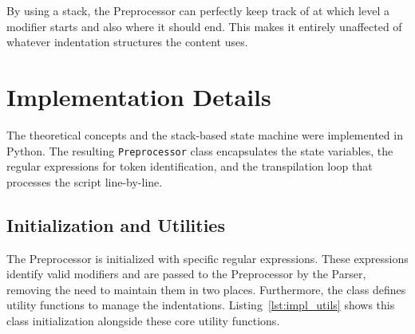 By using a stack, the Preprocessor can perfectly keep track of at which level a modifier starts and  also where it should end. This makes it entirely unaffected of whatever indentation structures the content uses.

\section{Implementation Details}


The theoretical concepts and the stack-based state machine were implemented in Python. The resulting \texttt{Preprocessor} class encapsulates the state variables, the regular expressions for token identification, and the transpilation loop that processes the script line-by-line. 


\subsection{Initialization and Utilities}


The Preprocessor is initialized with specific regular expressions. These expressions identify valid modifiers and are passed to the Preprocessor by the Parser, removing the need to maintain them in two places. Furthermore, the class defines utility functions to manage the indentations.
Listing~\ref{lst:impl_utils} shows this class initialization alongside these core utility functions.


